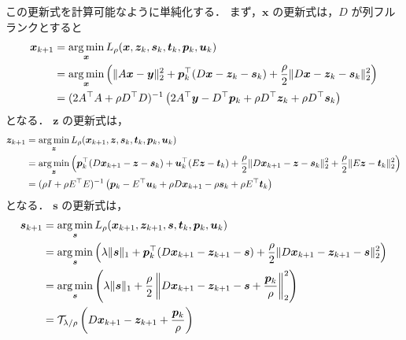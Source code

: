 この更新式を計算可能なように単純化する．
まず，$\bm{x}$ の更新式は，$D$ が列フルランクとすると
\begin{align}
    \bm{x}_{k+1}
     & = \operatorname*{arg \thinspace min}_{\bm{x}}
    L_{\rho}(\bm{x}, \bm{z}_k, \bm{s}_k, \bm{t}_k, \bm{p}_k, \bm{u}_k)
    \notag                                        \\
     & = \operatorname*{arg \thinspace min}_{\bm{x}} \left(
    \|A \bm{x} - \bm{y}\|_2^2
    + \bm{p}_k^\top (D \bm{x} - \bm{z}_k - \bm{s}_k)
    + \frac{\rho}{2} \|D \bm{x} - \bm{z}_k - \bm{s}_k\|_2^2
    \right)
    \notag                                        \\
     & = (2 A^\top A + \rho D^\top D)^{-1} \left(
    2 A^\top \bm{y} - D^\top \bm{p}_k + \rho D^\top \bm{z}_k + \rho D^\top \bm{s}_k
    \right)
\end{align}
となる．
$\bm{z}$ の更新式は，
\begin{align}
    \bm{z}_{k+1}
     & = \operatorname*{arg \thinspace min}_{\bm{z}}
    L_{\rho}(\bm{x}_{k+1}, \bm{z}, \bm{s}_k, \bm{t}_k, \bm{p}_k, \bm{u}_k)
    \notag                                    \\
     & = \operatorname*{arg \thinspace min}_{\bm{z}} \left(
    \bm{p}_k^\top (D \bm{x}_{k+1} - \bm{z} - \bm{s}_k)
    + \bm{u}_k^\top (E \bm{z} - \bm{t}_k)
    + \frac{\rho}{2} \|D \bm{x}_{k+1} - \bm{z} - \bm{s}_k\|_2^2
    + \frac{\rho}{2} \|E \bm{z} - \bm{t}_k\|_2^2
    \right)
    \notag                                    \\
     & = (\rho I + \rho E^\top E)^{-1} \left(
    \bm{p}_k - E^\top \bm{u}_k + \rho D \bm{x}_{k+1} - \rho \bm{s}_k + \rho E^\top \bm{t}_k
    \right)
\end{align}
となる．
$\bm{s}$ の更新式は，
\begin{align}
    \bm{s}_{k+1}
     & = \operatorname*{arg \thinspace min}_{\bm{s}}
    L_{\rho}(\bm{x}_{k+1}, \bm{z}_{k+1}, \bm{s}, \bm{t}_k, \bm{p}_k, \bm{u}_k)
    \notag                                                                                               \\
     & = \operatorname*{arg \thinspace min}_{\bm{s}} \left(
    \lambda \|\bm{s}\|_1
    + \bm{p}_k^\top (D \bm{x}_{k+1} - \bm{z}_{k+1} - \bm{s})
    + \frac{\rho}{2} \|D \bm{x}_{k+1} - \bm{z}_{k+1} - \bm{s}\|_2^2
    \right)
    \notag                                                                                               \\
     & = \operatorname*{arg \thinspace min}_{\bm{s}} \left(
    \lambda \|\bm{s}\|_1
    + \frac{\rho}{2} \left\|D \bm{x}_{k+1} - \bm{z}_{k+1} - \bm{s} + \frac{\bm{p}_k}{\rho} \right\|_2^2
    \right)
    \notag                                                                                               \\
     & = \mathcal{T}_{\lambda/\rho} \left( D \bm{x}_{k+1} - \bm{z}_{k+1} + \frac{\bm{p}_k}{\rho} \right)
\end{align}

